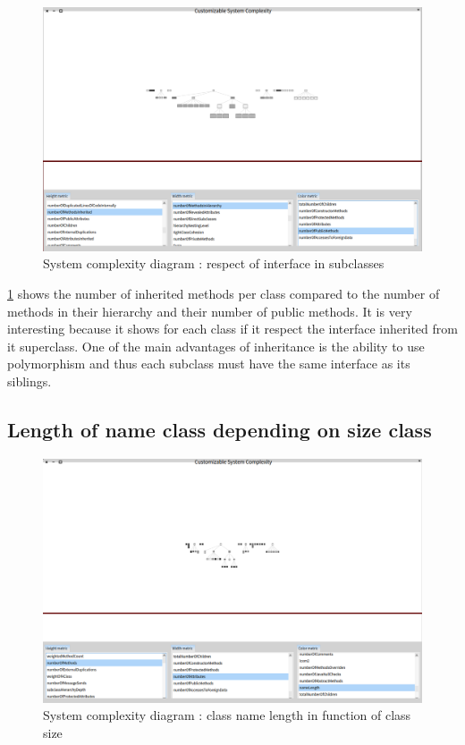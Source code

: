 \begin{figure}[H]
    \includegraphics[width=\textwidth]{numberofmethods2.png}
    \caption{\label{fig:numberofmethods} System complexity diagram : respect of interface in subclasses}
\end{figure}

\ref{fig:numberofmethods} shows the number of inherited methods per class compared to the number of methods in their hierarchy and their number of public methods.
It is very interesting because it shows for each class if it respect the interface inherited from it superclass. One of the main advantages of inheritance is the ability to use polymorphism and thus each subclass must have the same interface as its siblings.

\subsection{Length of name class depending on size class}


\begin{figure}[H]
    \includegraphics[width=\textwidth]{namelength.png}
    \caption{\label{fig:namelength} System complexity diagram : class name length in function of class size}
\end{figure}

